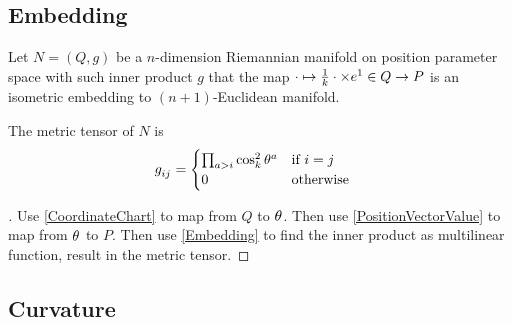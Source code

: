 \documentclass[stu, babel, american, biblatex, a4paper, draftall]{apa7}
\begin{document}
\subsection{Embedding}
\begin{definition}\label{Embedding}
    Let $N=\left(Q,g\right)$ be a $n$-dimension Riemannian manifold
    on position parameter space with such inner product $g$ that
    the map $\cdot\mapsto\frac{1}{k}\cdot\times\tensor{e}{^1}\in Q\to P$ is an isometric embedding to $\left(n+1\right)$-Euclidean manifold.
\end{definition}
\begin{lemma}\label{Model:MetricTensor}
    The metric tensor of $N$ is
    \begin{align*}
        \tensor{g}{_i_j} & =
        \begin{cases}
            \prod_{a>i}{\cos_k^2{\tensor{\theta}{^a}}} & \text{if $i=j$}  \\
            0                                          & \text{otherwise} \\
        \end{cases}
    \end{align*}
\end{lemma}
\begin{proof}[]
    \skipped

    Use \cref{CoordinateChart} to map from $Q$ to $\tensor{\theta}{}$.
    Then use \cref{PositionVectorValue} to map from $\tensor{\theta}{}$ to $P$.
    Then use \cref{Embedding} to find the inner product as multilinear function, result in the metric tensor.
\end{proof}
\subsection{Curvature}
\end{document}
